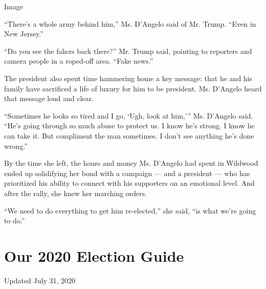 Image

``There's a whole army behind him,'' Ms. D'Angelo said of Mr. Trump.
``Even in New Jersey.''

``Do you see the fakers back there?'' Mr. Trump said, pointing to
reporters and camera people in a roped-off area. ``Fake news.''

The president also spent time hammering home a key message: that he and
his family have sacrificed a life of luxury for him to be president. Ms.
D'Angelo heard that message loud and clear.

``Sometimes he looks so tired and I go, `Ugh, look at him,''' Ms.
D'Angelo said. ``He's going through so much abuse to protect us. I know
he's strong. I know he can take it. But compliment the man sometimes. I
don't see anything he's done wrong.''

By the time she left, the hours and money Ms. D'Angelo had spent in
Wildwood ended up solidifying her bond with a campaign --- and a
president --- who has prioritized his ability to connect with his
supporters on an emotional level. And after the rally, she knew her
marching orders.

``We need to do everything to get him re-elected,'' she said, ``is what
we're going to do.''

\hypertarget{our-2020-election-guide}{%
\section{Our 2020 Election Guide}\label{our-2020-election-guide}}

Updated July 31, 2020


